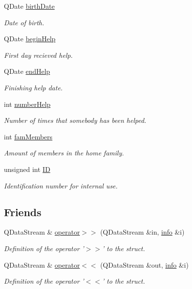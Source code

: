 \begin{DoxyCompactItemize}
Q\+Date \hyperlink{struct_person_1_1info_a803a2ee586aaa2503e10447b1435e916}{birth\+Date}
\begin{DoxyCompactList}\small\item\em Date of birth. \end{DoxyCompactList}\item 
Q\+Date \hyperlink{struct_person_1_1info_a835c907e641433331e06c62bcde9dfe9}{begin\+Help}
\begin{DoxyCompactList}\small\item\em First day recieved help. \end{DoxyCompactList}\item 
Q\+Date \hyperlink{struct_person_1_1info_acc738154c5e01adc22c880fc49d6e09c}{end\+Help}
\begin{DoxyCompactList}\small\item\em Finishing help date. \end{DoxyCompactList}\item 
int \hyperlink{struct_person_1_1info_a6fd0e334bf6cc9baf667ef94806ed993}{number\+Help}
\begin{DoxyCompactList}\small\item\em Number of times that somebody has been helped. \end{DoxyCompactList}\item 
int \hyperlink{struct_person_1_1info_afc121f83e810c2c0318e115f4ba6d730}{fam\+Members}
\begin{DoxyCompactList}\small\item\em Amount of members in the home family. \end{DoxyCompactList}\item 
unsigned int \hyperlink{struct_person_1_1info_a535ca27747d371eb58005194190f6bd6}{I\+D}
\begin{DoxyCompactList}\small\item\em Identification number for internal use. \end{DoxyCompactList}\end{DoxyCompactItemize}
\subsection*{Friends}
\begin{DoxyCompactItemize}
\item 
Q\+Data\+Stream \& \hyperlink{struct_person_1_1info_aa1cff6f546458f788536a635780f7014}{operator$>$$>$} (Q\+Data\+Stream \&in, \hyperlink{struct_person_1_1info}{info} \&i)
\begin{DoxyCompactList}\small\item\em Definition of the operator '$>$$>$' to the struct. \end{DoxyCompactList}\item 
Q\+Data\+Stream \& \hyperlink{struct_person_1_1info_abc99bd8cbdd8d6f6ee6a15abc543fd26}{operator$<$$<$} (Q\+Data\+Stream \&out, \hyperlink{struct_person_1_1info}{info} \&i)
\begin{DoxyCompactList}\small\item\em Definition of the operator '$<$$<$' to the struct. \end{DoxyCompactList}\end{DoxyCompactItemize}


